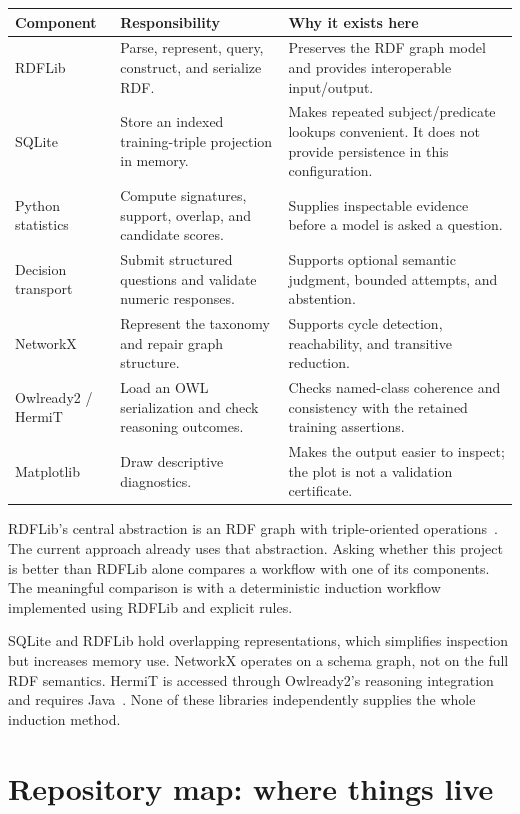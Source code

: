 \documentclass[11pt,a4paper]{article}
\begin{document}
\begin{tabularx}{\textwidth}{@{}P{28mm}YY@{}}
\toprule
Component & Responsibility & Why it exists here \\
\midrule
RDFLib & Parse, represent, query, construct, and serialize RDF. & Preserves the RDF graph model and provides interoperable input/output. \\
SQLite & Store an indexed training-triple projection in memory. & Makes repeated subject/predicate lookups convenient. It does not provide persistence in this configuration. \\
Python statistics & Compute signatures, support, overlap, and candidate scores. & Supplies inspectable evidence before a model is asked a question. \\
Decision transport & Submit structured questions and validate numeric responses. & Supports optional semantic judgment, bounded attempts, and abstention. \\
NetworkX & Represent the taxonomy and repair graph structure. & Supports cycle detection, reachability, and transitive reduction. \\
Owlready2 / HermiT & Load an OWL serialization and check reasoning outcomes. & Checks named-class coherence and consistency with the retained training assertions. \\
Matplotlib & Draw descriptive diagnostics. & Makes the output easier to inspect; the plot is not a validation certificate. \\
\bottomrule
\end{tabularx}

RDFLib's central abstraction is an RDF graph with triple-oriented operations~\cite{rdflib}.
The current approach already uses that abstraction. Asking whether this project
is better than RDFLib alone compares a workflow with one of its components.
The meaningful comparison is with a deterministic induction workflow implemented
using RDFLib and explicit rules.

SQLite and RDFLib hold overlapping representations, which simplifies inspection
but increases memory use. NetworkX operates on a schema graph, not on the full
RDF semantics. HermiT is accessed through Owlready2's reasoning integration and
requires Java~\cite{owlready}. None of these libraries independently supplies the
whole induction method.

\section{Repository map: where things live}\label{sec:map}
\end{document}
